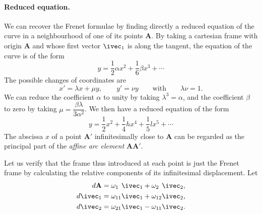 \paragraph{Reduced equation.}
\label{sec:139}
We can recover the Frenet formulae by finding directly a reduced equation of the curve in a neighbourhood of one of its points $\mathbf{A}$. By taking a cartesian frame with origin $\mathbf{A}$ and whose first vector $\ivec_{1}$ is along the tangent, the equation of the curve is of the form
\[
y=\frac{1}{2}\alpha x^{2}+\frac{1}{6}\beta x^{3}+\cdots
\]
The possible changes of coordinates are
\[
x'=\lambda x+\mu y,\qquad y'=\nu y\qquad\text{with}\qquad\lambda \nu=1.
\]
We can reduce the coefficient $\alpha$ to unity by taking $\lambda^{3}=\alpha$, and the coefficient $\beta$ to zero by taking $\mu=\dfrac{\beta\lambda}{3\alpha^{2}}$. We then have a reduced equation of the form
\[
y=\frac{1}{2}x^{2}+\frac{1}{4} hx^{4}+\frac{1}{5} lx^{5}+\cdots
\]
The abscissa $x$ of a point $\mathbf{A}'$ infinitesimally close to $\mathbf{A}$ can be regarded as the principal part of the \emph{affine arc element} $\mathbf{AA}'$.

Let us verify that the frame thus introduced at each point is just the Frenet frame by calculating the relative components of its infinitesimal displacement. Let
\begin{align*}
  d\mathbf{A}&=\omega_{1\phantom{0}}\ivec_{1}+\omega_{2\phantom{0}}\ivec_{2},\\
  d\ivec_{1}&=\omega_{11}\ivec_{1}+\omega_{12}\ivec_{2},\\
  d\ivec_{2}&=\omega_{21}\ivec_{1}-\omega_{11}\ivec_{2}.
\end{align*}

